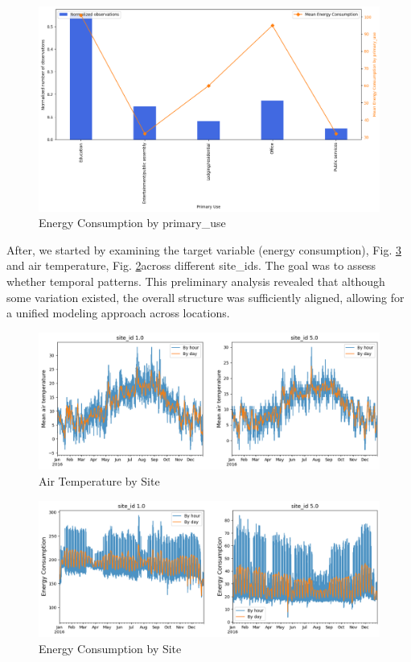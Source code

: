 \begin{figure}[!h]
    \centering
    \includegraphics[width=0.75\linewidth]{images/energy_consu_by_primary_use.png}
    \caption{Energy Consumption by primary\_use}
    \label{fig:energy_consu_by_primary_use}
\end{figure}

After, we started by examining the target variable (energy consumption), Fig. \ref{fig:energy_consu_by_site} and air temperature, Fig. \ref{fig:temp_by_site}across different site\_ids. The goal was to assess whether temporal patterns. This preliminary analysis revealed that although some variation existed, the overall structure was sufficiently aligned, allowing for a unified modeling approach across locations.

\begin{figure}[!h]
    \centering
    \includegraphics[width=\linewidth]{images/temperature-by-site.png}
    \caption{Air Temperature by Site}
    \label{fig:temp_by_site}
\end{figure}
\begin{figure}[!h]
    \centering
    \includegraphics[width=1\linewidth]{images/energy-by-id.png}
    \caption{Energy Consumption by Site}
    \label{fig:energy_consu_by_site}
\end{figure}

